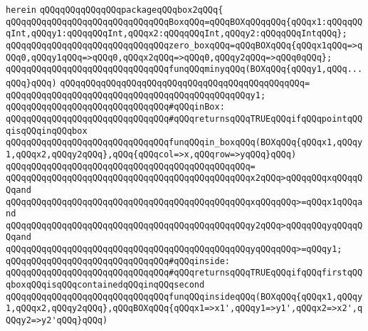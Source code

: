 \verb|herein|\newline
\verb|qQQqqQQqqQQqqQQqpackageqQQqbox2qQQq{|\newline
\newline
\verb|qQQqqQQqqQQqqQQqqQQqqQQqqQQqqQQqBoxqQQq=qQQqBOXqQQqqQQq{qQQqx1:qQQqqQQqInt,qQQqy1:qQQqqQQqInt,qQQqx2:qQQqqQQqInt,qQQqy2:qQQqqQQqIntqQQq};|\newline
\newline
\verb|qQQqqQQqqQQqqQQqqQQqqQQqqQQqqQQqzero_boxqQQq=qQQqBOXqQQq{qQQqx1qQQq=>qQQq0,qQQqy1qQQq=>qQQq0,qQQqx2qQQq=>qQQq0,qQQqy2qQQq=>qQQq0qQQq};|\newline
\newline
\verb|qQQqqQQqqQQqqQQqqQQqqQQqqQQqqQQqfunqQQqminyqQQq(BOXqQQq{qQQqy1,qQQq...qQQq}qQQq)|\newline
\verb|qQQqqQQqqQQqqQQqqQQqqQQqqQQqqQQqqQQqqQQqqQQqqQQq=|\newline
\verb|qQQqqQQqqQQqqQQqqQQqqQQqqQQqqQQqqQQqqQQqqQQqqQQqy1;|\newline
\newline
\verb|qQQqqQQqqQQqqQQqqQQqqQQqqQQqqQQq#qQQqinBox:|\newline
\verb|qQQqqQQqqQQqqQQqqQQqqQQqqQQqqQQq#qQQqreturnsqQQqTRUEqQQqifqQQqpointqQQqisqQQqinqQQqbox|\newline
\newline
\verb|qQQqqQQqqQQqqQQqqQQqqQQqqQQqqQQqfunqQQqin_boxqQQq(BOXqQQq{qQQqx1,qQQqy1,qQQqx2,qQQqy2qQQq},qQQq{qQQqcol=>x,qQQqrow=>yqQQq}qQQq)|\newline
\verb|qQQqqQQqqQQqqQQqqQQqqQQqqQQqqQQqqQQqqQQqqQQqqQQq=|\newline
\verb|qQQqqQQqqQQqqQQqqQQqqQQqqQQqqQQqqQQqqQQqqQQqqQQqx2qQQq>qQQqqQQqxqQQqqQQqand|\newline
\verb|qQQqqQQqqQQqqQQqqQQqqQQqqQQqqQQqqQQqqQQqqQQqqQQqxqQQqqQQq>=qQQqx1qQQqand|\newline
\verb|qQQqqQQqqQQqqQQqqQQqqQQqqQQqqQQqqQQqqQQqqQQqqQQqy2qQQq>qQQqqQQqyqQQqqQQqand|\newline
\verb|qQQqqQQqqQQqqQQqqQQqqQQqqQQqqQQqqQQqqQQqqQQqqQQqyqQQqqQQq>=qQQqy1;|\newline
\newline
\verb|qQQqqQQqqQQqqQQqqQQqqQQqqQQqqQQq#qQQqinside:|\newline
\verb|qQQqqQQqqQQqqQQqqQQqqQQqqQQqqQQq#qQQqreturnsqQQqTRUEqQQqifqQQqfirstqQQqboxqQQqisqQQqcontainedqQQqinqQQqsecond|\newline
\newline
\verb|qQQqqQQqqQQqqQQqqQQqqQQqqQQqqQQqfunqQQqinsideqQQq(BOXqQQq{qQQqx1,qQQqy1,qQQqx2,qQQqy2qQQq},qQQqBOXqQQq{qQQqx1=>x1',qQQqy1=>y1',qQQqx2=>x2',qQQqy2=>y2'qQQq}qQQq)|\newline
